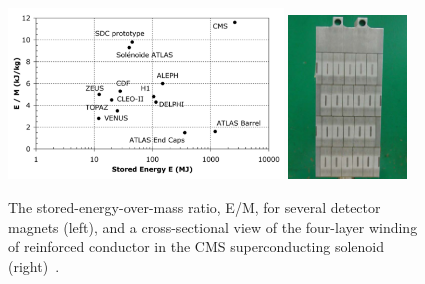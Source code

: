 \begin{figure}
\centering
\includegraphics[width=0.65\textwidth]{figures/lhc_and_cms/solenoid_energyOverMass_vs_mass.png}
\hspace{5 mm}
\includegraphics[width=0.28\textwidth]{figures/lhc_and_cms/solenoid_cross_section.png}
\caption{The stored-energy-over-mass ratio, E/M, for several detector magnets (left), and a cross-sectional view of the four-layer winding of reinforced conductor in the CMS superconducting solenoid (right)~\cite{cms_experiment}.}
\label{solenoid_figures}
\end{figure}